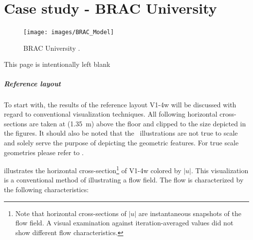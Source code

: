 
\chapter{Case study - BRAC University}
\label{chap:case_study_BRAC_U}


\blindtext[2]



\begin{figure}[hbt]
	\centering
	\texttt{[image: images/BRAC\_Model]}
	\caption[BRAC University]{BRAC University \cite{WOHA}.}
	\label{fig:bracmodel}
\end{figure}





\clearpage

\thispagestyle{empty}
\vspace*{\fill}
\begin{center}
\sffamily This page is intentionally left blank
\end{center}
\vspace*{\fill}


\clearpage

\paragraph{Reference layout}

To start with, the results of the reference layout V1-4w will be discussed with regard to conventional visualization techniques.
All following horizontal cross-sections are taken at (\SI{1.35}{\metre}) above the floor and clipped to the size depicted in the figures. It should  also be noted that the \ACR\ illustrations are not true to scale and solely serve the purpose of depicting the geometric features. For true scale geometries please refer to .

 illustrates the horizontal cross-section\footnote{Note that horizontal cross-sections of $|u|$ are instantaneous snapshots of the flow field. A visual examination against iteration-averaged values did not show different flow characteristics.} of V1-4w colored by $|u|$. This visualization is a conventional method of illustrating a flow field.
The flow is characterized by the following characteristics:

